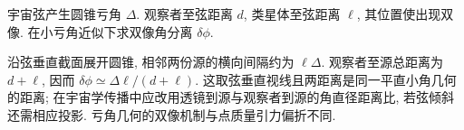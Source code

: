 \begin{exercise}
宇宙弦产生圆锥亏角 $\Delta$. 观察者至弦距离 $d$, 类星体至弦距离 $\ell$, 其位置使出现双像. 在小亏角近似下求双像角分离 $\delta\phi$.
\end{exercise}
\begin{solution}
沿弦垂直截面展开圆锥, 相邻两份源的横向间隔约为 $\ell\Delta$. 观察者至源总距离为 $d+\ell$, 因而 $\delta\phi\simeq\Delta\ell/(d+\ell)$. 这取弦垂直视线且两距离是同一平直小角几何的距离; 在宇宙学传播中应改用透镜到源与观察者到源的角直径距离比, 若弦倾斜还需相应投影. 亏角几何的双像机制与点质量引力偏折不同.
\end{solution}
